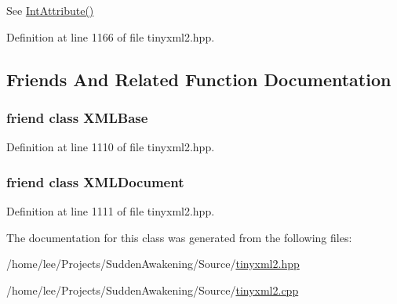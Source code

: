 See \hyperlink{classtinyxml2_1_1_x_m_l_element_af86f05771c11a73a2896b662bb589ef5}{Int\-Attribute()} 



Definition at line 1166 of file tinyxml2.\-hpp.



\subsection{Friends And Related Function Documentation}
\hypertarget{classtinyxml2_1_1_x_m_l_element_a449202cfc89e7ae5c2f81995476f9ec1}{
\subsubsection[{X\-M\-L\-Base}]{\setlength{\rightskip}{0pt plus 5cm}friend class X\-M\-L\-Base\hspace{0.3cm}{\ttfamily [friend]}}}\label{classtinyxml2_1_1_x_m_l_element_a449202cfc89e7ae5c2f81995476f9ec1}


Definition at line 1110 of file tinyxml2.\-hpp.

\hypertarget{classtinyxml2_1_1_x_m_l_element_a4eee3bda60c60a30e4e8cd4ea91c4c6e}{
\subsubsection[{X\-M\-L\-Document}]{\setlength{\rightskip}{0pt plus 5cm}friend class {\bf X\-M\-L\-Document}\hspace{0.3cm}{\ttfamily [friend]}}}\label{classtinyxml2_1_1_x_m_l_element_a4eee3bda60c60a30e4e8cd4ea91c4c6e}


Definition at line 1111 of file tinyxml2.\-hpp.



The documentation for this class was generated from the following files\-:\begin{DoxyCompactItemize}
\item 
/home/lee/\-Projects/\-Sudden\-Awakening/\-Source/\hyperlink{tinyxml2_8hpp}{tinyxml2.\-hpp}\item 
/home/lee/\-Projects/\-Sudden\-Awakening/\-Source/\hyperlink{tinyxml2_8cpp}{tinyxml2.\-cpp}\end{DoxyCompactItemize}
